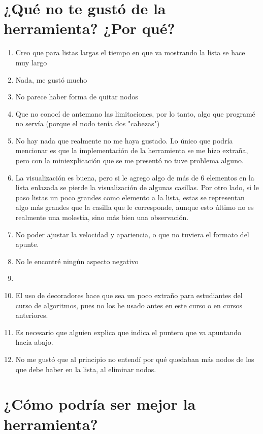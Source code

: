 \section{¿Qué no te gustó de la herramienta? ¿Por qué?}

\begin{enumerate}
    \item Creo que para listas largas el tiempo en que va mostrando la lista se hace muy largo
    \item Nada, me gustó mucho
    \item No parece haber forma de quitar nodos
    \item Que no conocí de antemano las limitaciones, por lo tanto, algo que programé no servía (porque el nodo tenía dos "cabezas")
    \item No hay nada que realmente no me haya gustado. Lo único que podría mencionar es que la implementación de la herramienta se me hizo extraña, pero con la miniexplicación que se me presentó no tuve problema alguno.
    \item La visualización es buena, pero si le agrego algo de más de 6 elementos en la lista enlazada se pierde la visualización de algunas casillas. Por otro lado, si le paso listas un poco grandes como elemento a la lista, estas se representan algo más grandes que la casilla que le corresponde, aunque esto último no es realmente una molestia, sino más bien una observación.
    \item No poder ajustar la velocidad y apariencia, o que no tuviera el formato del apunte.
    \item No le encontré ningún aspecto negativo
    \item 
    \item El uso de decoradores hace que sea un poco extraño para estudiantes del curso de algoritmos, pues no los he usado antes en este curso o en cursos anteriores.
    \item Es necesario que alguien explica que indica el puntero que va apuntando hacia abajo.
    \item No me gustó que al principio no entendí por qué quedaban más nodos de los que debe haber en la lista, al eliminar nodos.
\end{enumerate}

\section{¿Cómo podría ser mejor la herramienta?}


